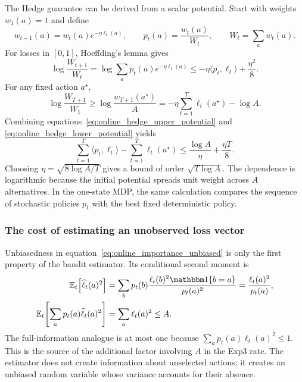 The Hedge guarantee can be derived from a scalar potential. Start with weights $w_1(a)=1$ and define
\[
w_{t+1}(a)=w_t(a)e^{-\eta\ell_t(a)},
\qquad
p_t(a)=\frac{w_t(a)}{W_t},
\qquad
W_t=\sum_aw_t(a).
\]
For losses in $[0,1]$, Hoeffding's lemma gives
\begin{equation}
\log\frac{W_{t+1}}{W_t}
=
\log\sum_ap_t(a)e^{-\eta\ell_t(a)}
\leq
-\eta\langle p_t,\ell_t\rangle+\frac{\eta^2}{8}.
\label{eq:online_hedge_upper_potential}
\end{equation}
For any fixed action $a^\star$,
\begin{equation}
\log\frac{W_{T+1}}{W_1}
\geq
\log\frac{w_{T+1}(a^\star)}{A}
=
-\eta\sum_{t=1}^T\ell_t(a^\star)-\log A.
\label{eq:online_hedge_lower_potential}
\end{equation}
Combining equations~\eqref{eq:online_hedge_upper_potential} and \eqref{eq:online_hedge_lower_potential} yields
\begin{equation}
\sum_{t=1}^T\langle p_t,\ell_t\rangle
-
\sum_{t=1}^T\ell_t(a^\star)
\leq
\frac{\log A}{\eta}+\frac{\eta T}{8}.
\label{eq:online_hedge_bound}
\end{equation}
Choosing $\eta=\sqrt{8\log A/T}$ gives a bound of order $\sqrt{T\log A}$. The dependence is logarithmic because the initial potential spreads unit weight across $A$ alternatives. In the one-state MDP, the same calculation compares the sequence of stochastic policies $p_t$ with the best fixed deterministic policy.

\subsubsection{The cost of estimating an unobserved loss vector}

Unbiasedness in equation~\eqref{eq:online_importance_unbiased} is only the first property of the bandit estimator. Its conditional second moment is
\begin{align}
\mathbb E_t\!\left[\widehat\ell_t(a)^2\right]
&=
\sum_b p_t(b)
\frac{\ell_t(b)^2\indicator{b=a}}{p_t(a)^2}
=
\frac{\ell_t(a)^2}{p_t(a)}, \\
\mathbb E_t\!\left[\sum_a p_t(a)\widehat\ell_t(a)^2\right]
&=
\sum_a\ell_t(a)^2
\leq A.
\label{eq:online_bandit_second_moment}
\end{align}
The full-information analogue is at most one because $\sum_ap_t(a)\ell_t(a)^2\leq1$. This is the source of the additional factor involving $A$ in the Exp3 rate. The estimator does not create information about unselected actions; it creates an unbiased random variable whose variance accounts for their absence.

